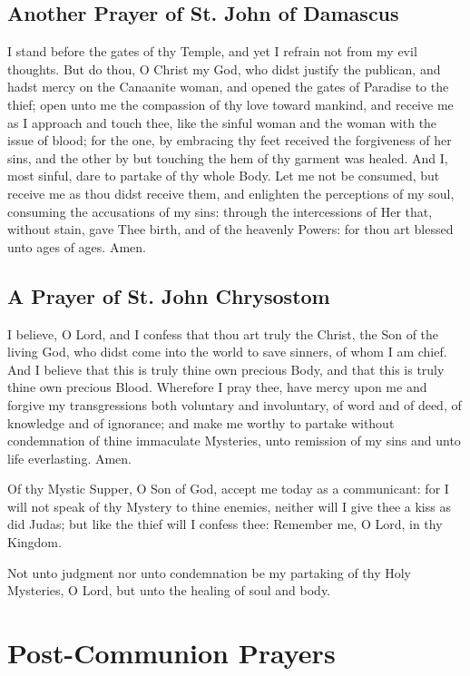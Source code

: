 \subsection{Another Prayer of St. John of Damascus}

    I stand before the gates of thy Temple, and yet I refrain not from my evil thoughts. But do thou, O Christ my God, who didst justify the publican, and hadst mercy on the Canaanite woman, and opened the gates of Paradise to the thief; open unto me the compassion of thy love toward mankind, and receive me as I approach and touch thee, like the sinful woman and the woman with the issue of blood; for the one, by embracing thy feet received the forgiveness of her sins, and the other by but touching the hem of thy garment was healed. And I, most sinful, dare to partake of thy whole Body. Let me not be consumed, but receive me as thou didst receive them, and enlighten the perceptions of my soul, consuming the accusations of my sins: through the intercessions of Her that, without stain, gave Thee birth, and of the heavenly Powers: for thou art blessed unto ages of ages. Amen.

\subsection{A Prayer of St. John Chrysostom}

    I believe, O Lord, and I confess that thou art truly the Christ, the Son of the living God, who didst come into the world to save sinners, of whom I am chief. And I believe that this is truly thine own precious Body, and that this is truly thine own precious Blood. Wherefore I pray thee, have mercy upon me and forgive my transgressions both voluntary and involuntary, of word and of deed, of knowledge and of ignorance; and make me worthy to partake without condemnation of thine immaculate Mysteries, unto remission of my sins and unto life everlasting. Amen.

    Of thy Mystic Supper, O Son of God, accept me today as a communicant: for I will not speak of thy Mystery to thine enemies, neither will I give thee a kiss as did Judas; but like the thief will I confess thee: Remember me, O Lord, in thy Kingdom.

    Not unto judgment nor unto condemnation be my partaking of thy Holy Mysteries, O Lord, but unto the healing of soul and body.

\cleardoublepage

\section{Post-Communion Prayers}

